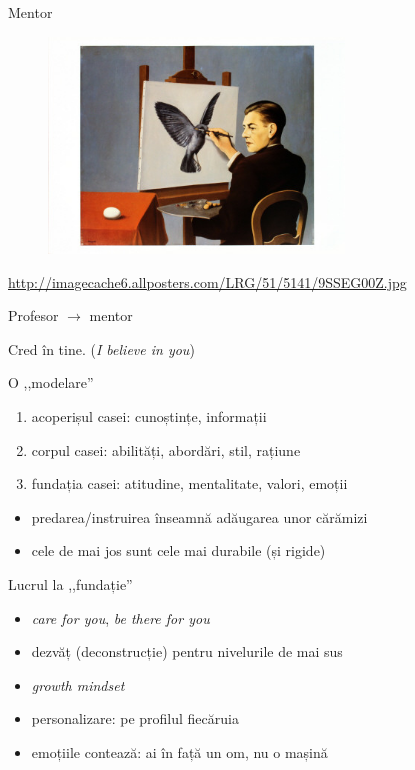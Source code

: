\documentclass{simple}
\begin{document}
\begin{frame}{Mentor}
  \begin{figure}
    \centering
    \includegraphics[width=0.7\textwidth]{img/egg-painter}
  \end{figure}
  \begin{center}
    \scriptsize
    \url{http://imagecache6.allposters.com/LRG/51/5141/9SSEG00Z.jpg}
  \end{center}
\end{frame}

\begin{frame}{Profesor $\rightarrow$ mentor}
  \begin{center}
    Cred în tine. (\textit{I believe in you})
  \end{center}
\end{frame}

\begin{frame}{O ,,modelare''}
  \begin{enumerate}
    \pause
    \item acoperișul casei: cunoștințe, informații
    \pause
    \item corpul casei: abilități, abordări, stil, rațiune
    \pause
    \item fundația casei: atitudine, mentalitate, valori, emoții
  \end{enumerate}
  \begin{itemize}
    \pause
    \item predarea/instruirea înseamnă adăugarea unor cărămizi
    \pause
    \item cele de mai jos sunt cele mai durabile (și rigide)
  \end{itemize}
\end{frame}

\begin{frame}{Lucrul la ,,fundație''}
  \begin{itemize}
    \pause
    \item \textit{care for you}, \textit{be there for you}
    \pause
    \item dezvăț (deconstrucție) pentru nivelurile de mai sus
    \pause
    \item \textit{growth mindset}
    \pause
    \item personalizare: pe profilul fiecăruia
    \pause
    \item emoțiile contează: ai în față un om, nu o mașină
  \end{itemize}
\end{frame}
\end{document}
